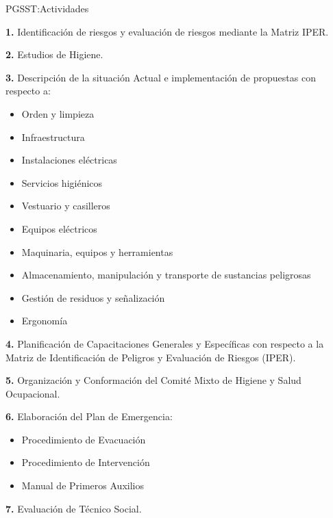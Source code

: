 \documentclass[spanish]{beamer} %
\begin{document}
\begin{frame}{PGSST:Actividades}
  \begin{minipage}[t]{0.48\textwidth}
    \scriptsize
    \textbf{1.} Identificación de riesgos y evaluación de riesgos mediante la Matriz IPER.
    
    \textbf{2.} Estudios de Higiene.
    
    \textbf{3.} Descripción de la situación Actual e implementación de propuestas con respecto a:
    \begin{itemize}
      \item Orden y limpieza
      \item Infraestructura
      \item Instalaciones eléctricas
      \item Servicios higiénicos
      \item Vestuario y casilleros
      \item Equipos eléctricos
      \item Maquinaria, equipos y herramientas
      \item Almacenamiento, manipulación y transporte de sustancias peligrosas
      \item Gestión de residuos y señalización
      \item Ergonomía
    \end{itemize}
  \end{minipage}
  \hfill
  \begin{minipage}[t]{0.48\textwidth}
    \scriptsize
    
    \textbf{4.} Planificación de Capacitaciones Generales y Específicas con respecto a la Matriz de Identificación de Peligros y Evaluación de Riesgos (IPER).
    
    \textbf{5.} Organización y Conformación del Comité Mixto de Higiene y Salud Ocupacional.
    
    \textbf{6.} Elaboración del Plan de Emergencia:
    \begin{itemize}
      \item Procedimiento de Evacuación
      \item Procedimiento de Intervención
      \item Manual de Primeros Auxilios
    \end{itemize}
    
    \textbf{7.} Evaluación de Técnico Social.
  \end{minipage}
\end{frame}
\end{document}
